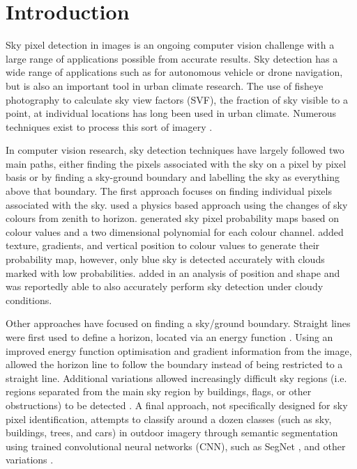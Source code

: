 \documentclass[final,3p,times,authoryear]{elsarticle}
\begin{document}
\section{Introduction}\label{sec:introduction}
Sky pixel detection in images is an ongoing computer vision challenge with a large range of applications possible from accurate results. Sky detection has a wide range of applications such as for autonomous vehicle or drone navigation, but is also an important tool in urban climate research. The use of fisheye photography to calculate sky view factors (SVF), the fraction of sky visible to a point, at individual locations has long been used in urban climate. Numerous techniques exist to process this sort of imagery \citep{Grimmond2001,Chapman2004,Ali-Toudert2007}.

In computer vision research, sky detection techniques have largely followed two main paths, either finding the pixels associated with the sky on a pixel by pixel basis or by finding a sky-ground boundary and labelling the sky as everything above that boundary. The first approach focuses on finding individual pixels associated with the sky. \cite{Luo2002} used a physics based approach using the changes of sky colours from zenith to horizon. \cite{Gallagher2004} generated sky pixel probability maps based on colour values and a two dimensional polynomial for each colour channel. \cite{Zafarifar2007} added texture, gradients, and vertical position to colour values to generate their probability map, however, only blue sky is detected accurately with clouds marked with low probabilities. \cite{Schmitt2009} added in an analysis of position and shape and was reportedly able to also accurately perform sky detection under cloudy conditions. 

Other approaches have focused on finding a sky/ground boundary. Straight lines were first used to define a horizon, located via an energy function \citep{Ettinger2003}. Using an improved energy function optimisation and gradient information from the image, \cite{Shen2013} allowed the horizon line to follow the boundary instead of being restricted to a straight line. Additional variations allowed increasingly difficult sky regions (i.e. regions separated from the main sky region by buildings, flags, or other obstructions) to be detected \citep{Zhijie2014,Zhijie2015}. A final approach, not specifically designed for sky pixel identification, attempts to classify around a dozen classes (such as sky, buildings, trees, and cars) in outdoor imagery through semantic segmentation using trained convolutional neural networks (CNN), such as SegNet \citep{Badrinarayanan2017}, and other variations \citep{Holder2016,Middel2019}.
\end{document}
